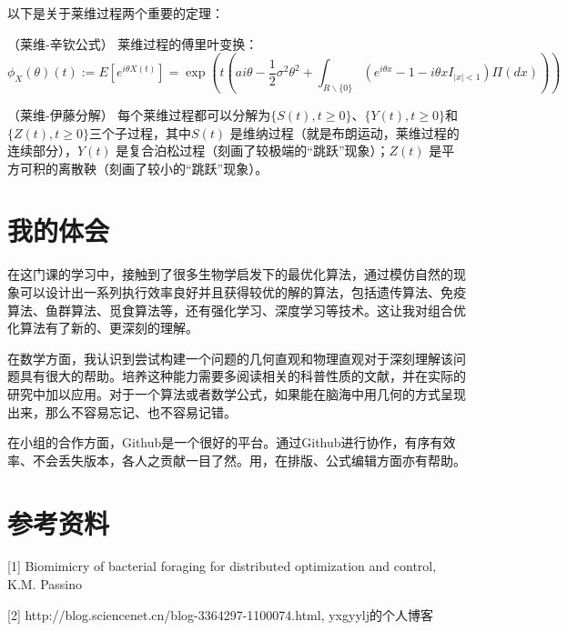 \documentclass{article}
\begin{document}
以下是关于莱维过程两个重要的定理：

（莱维-辛钦公式）
莱维过程的傅里叶变换：
\begin{equation}
\phi_X(\theta)(t) := E[e^{i\theta X(t)}] = \exp(t(ai\theta-\frac{1}{2}\sigma^2\theta^2 + \int_{R\backslash \{0\}}(e^{i\theta x} - 1 - i\theta x I_{|x| < 1})\Pi(dx)))
\end{equation}

（莱维-伊藤分解）
每个莱维过程都可以分解为$\{S(t), t \geq 0\}$、$\{Y(t), t \geq 0\}$和$\{Z(t), t \geq 0\}$三个子过程，其中$S(t)$ 是维纳过程（就是布朗运动，莱维过程的连续部分），$Y(t)$ 是复合泊松过程（刻画了较极端的``跳跃''现象）；$Z(t)$ 是平方可积的离散鞅（刻画了较小的``跳跃''现象）。

\section{我的体会}
在这门课的学习中，接触到了很多生物学启发下的最优化算法，通过模仿自然的现象可以设计出一系列执行效率良好并且获得较优的解的算法，包括遗传算法、免疫算法、鱼群算法、觅食算法等，还有强化学习、深度学习等技术。这让我对组合优化算法有了新的、更深刻的理解。

在数学方面，我认识到尝试构建一个问题的几何直观和物理直观对于深刻理解该问题具有很大的帮助。培养这种能力需要多阅读相关的科普性质的文献，并在实际的研究中加以应用。对于一个算法或者数学公式，如果能在脑海中用几何的方式呈现出来，那么不容易忘记、也不容易记错。

在小组的合作方面，Github是一个很好的平台。通过Github进行协作，有序有效率、不会丢失版本，各人之贡献一目了然。用，在排版、公式编辑方面亦有帮助。

\section{参考资料}

[1] Biomimicry of bacterial foraging for distributed optimization and control, K.M. Passino

[2] http://blog.sciencenet.cn/blog-3364297-1100074.html, yxgyylj的个人博客
\end{document}
